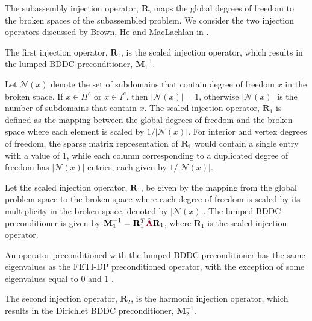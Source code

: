 The subassembly injection operator, $\mathbf{R}$, maps the global degrees of freedom to the broken spaces of the subassembled problem.
We consider the two injection operators discussed by Brown, He and MacLachlan in \cite{brown2019local}.

The first injection operator, $\mathbf{R}_1$, is the scaled injection operator, which results in the lumped BDDC preconditioner, $\mathbf{M}^{-1}_1$.

Let $\mathcal{N} \left( x \right)$ denote the set of subdomains that contain degree of freedom $x$ in the broken space.
If $x \in \Pi^e$ or $x \in I^e$, then $\lvert \mathcal{N} \left( x \right) \rvert = 1$, otherwise $\lvert \mathcal{N} \left( x \right) \rvert$ is the number of subdomains that contain $x$.
The scaled injection operator, $\mathbf{R}_1$ is defined as the mapping between the global degrees of freedom and the broken space where each element is scaled by $1 / \lvert \mathcal{N} \left( x \right) \rvert$.
For interior and vertex degrees of freedom, the sparse matrix representation of $\mathbf{R}_1$ would contain a single entry with a value of $1$, while each column corresponding to a duplicated degree of freedom has $\lvert \mathcal{N} \left( x \right) \rvert$ entries, each given by $1 / \lvert \mathcal{N} \left( x \right) \rvert$.

\begin{definition}
Let the scaled injection operator, $\mathbf{R}_1$, be given by the mapping from the global problem space to the broken space where each degree of freedom is scaled by its multiplicity in the broken space, denoted by $\lvert \mathcal{N} \left( x \right) \rvert$.
The lumped BDDC preconditioner is given by $\mathbf{M}^{-1}_1 = \mathbf{R}_1^T \hat{\color{burgundy}\mathbf{A}} \mathbf{R}_1$, where $\mathbf{R}_1$ is the scaled injection operator.
\label{def:lumpedbddc}
\end{definition}

An operator preconditioned with the lumped BDDC preconditioner has the same eigenvalues as the FETI-DP preconditioned operator, with the exception of some eigenvalues equal to $0$ and $1$ \cite{li2007use}.

The second injection operator, $\mathbf{R}_2$, is the harmonic injection operator, which results in the Dirichlet BDDC preconditioner, $\mathbf{M}^{-1}_2$.

